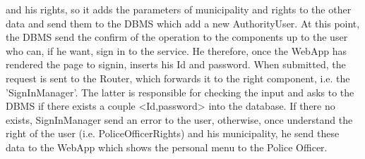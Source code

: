         and his rights, so it adds the parameters of municipality and rights to the other data 
        and send them to the DBMS which add a new AuthorityUser. At this point, the DBMS send 
        the confirm of the operation to the components up to the user who can, if he want, 
        sign in to the service. He therefore, once the WebApp has rendered the page to signin, 
        inserts his Id and password. When submitted, the request is sent to the Router, which 
        forwards it to the right component, i.e. the 'SignInManager'. The latter is responsible 
        for checking the input and asks to the DBMS if there exists a couple <Id,password> into 
        the database. If there no exists, SignInManager send an error to the user, otherwise, 
        once understand the right of the user (i.e. PoliceOfficerRights) and his municipality, 
        he send these data to the WebApp which shows the personal menu to the Police Officer. 

